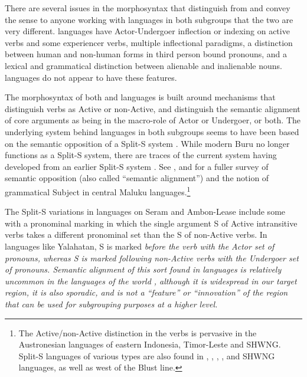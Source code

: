 \clearpage
{}
There are several issues in the morphosyntax that distinguish
 from  and convey the sense to anyone working with languages in both
subgroups that the two are very different.
 languages have Actor-Undergoer inflection or
indexing on active verbs
and some experiencer verbs,
multiple inflectional paradigms, a distinction between human
and non-human forms in third person bound pronouns,
and a lexical and grammatical distinction between alienable and inalienable nouns.
 languages do not appear to have these features.

The morphosyntax of both 
and  languages is built around mechanisms that
distinguish verbs as Active or non-Active,
and distinguish the semantic alignment of core arguments as being
in the macro-role of Actor or Undergoer, or both.
The underlying system behind languages in both subgroups seems
to have been based on the semantic opposition of a Split-S system \citep{Dixon1994}.
While modern Buru no longer functions as a Split-S system,
there are traces of the current system having developed from
an earlier Split-S system \citep[156--159]{Grimes1991c}.
See \citet{Ewing2010}, and \citet{Grimes2024} for a fuller survey
of semantic opposition (also called ``semantic alignment'')
and the notion of grammatical Subject in central Maluku languages.\footnote{
		The Active/non-Active distinction in the verbs is pervasive in the
		Austronesian languages of eastern Indonesia, Timor-Leste and SHWNG.
		Split-S languages of various types are also found in ,
		, , ,
		and SHWNG languages, as well as west of the Blust line.}

The Split-S variations in  languages on Seram
and Ambon-Lease include some with a pronominal marking in which
the single argument S of Active intransitive verbs takes a different
pronominal set than the S of non-Active verbs.
In languages like Yalahatan,
S is marked \it{before} the verb with the Actor set of pronouns,
whereas S is marked \it{following} non-Active verbs with the
Undergoer set of pronouns.
Semantic alignment of this sort found in  languages
is relatively uncommon in the languages of the world \citep{Siewierska2013},
although it is widespread in our target region,
it is also sporadic,
and is not a “feature” or “innovation” of the region that can
be used for subgrouping purposes at a higher level.

